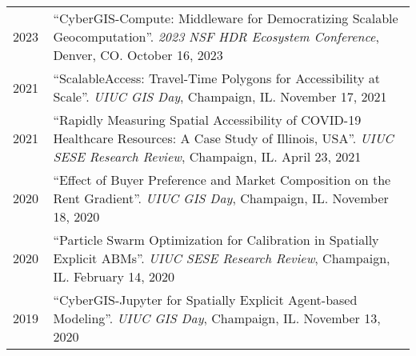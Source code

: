 \documentclass{acmcv}
\begin{document}
    \begin{longtable}{p{0.1\linewidth} p{0.9\linewidth}}
        2023 & ``CyberGIS-Compute: Middleware for Democratizing Scalable Geocomputation''. \textit{2023 NSF HDR Ecosystem Conference}, Denver, CO. October 16, 2023 \\

        2021 & ``ScalableAccess: Travel-Time Polygons for Accessibility at Scale''. \textit{UIUC GIS Day}, Champaign, IL. November 17, 2021 \\

        2021 & ``Rapidly Measuring Spatial Accessibility of COVID-19 Healthcare Resources: A Case Study of Illinois, USA''. \textit{UIUC SESE Research Review}, Champaign, IL. April 23, 2021 \\ 

        2020 & ``Effect of Buyer Preference and Market Composition on the Rent Gradient''. \textit{UIUC GIS Day}, Champaign, IL. November 18, 2020 \\

        2020 & ``Particle Swarm Optimization for Calibration in Spatially Explicit ABMs''. \textit{UIUC SESE Research Review}, Champaign, IL. February 14, 2020 \\ 

        2019 & ``CyberGIS-Jupyter for Spatially Explicit Agent-based Modeling''. \textit{UIUC GIS Day}, Champaign, IL. November 13, 2020 \\

    \end{longtable}




\end{document}
